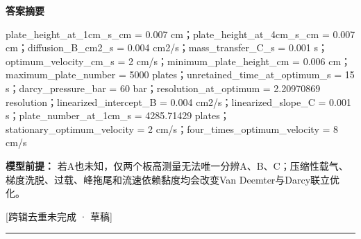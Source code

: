 \documentclass[UTF8,11pt,a4paper]{ctexart}
\begin{document}
\noindent\textbf{答案摘要}\par
plate\_height\_at\_1cm\_s\_cm = 0.007 cm；plate\_height\_at\_4cm\_s\_cm = 0.007 cm；diffusion\_B\_cm2\_s = 0.004 cm2/s；mass\_transfer\_C\_s = 0.001 s；optimum\_velocity\_cm\_s = 2 cm/s；minimum\_plate\_height\_cm = 0.006 cm；maximum\_plate\_number = 5000 plates；unretained\_time\_at\_optimum\_s = 15 s；darcy\_pressure\_bar = 60 bar；resolution\_at\_optimum = 2.20970869 resolution；linearized\_intercept\_B = 0.004 cm2/s；linearized\_slope\_C = 0.001 s；plate\_number\_at\_1cm\_s = 4285.71429 plates；stationary\_optimum\_velocity = 2 cm/s；four\_times\_optimum\_velocity = 8 cm/s\par
\noindent\textbf{模型前提：}
若A也未知，仅两个板高测量无法唯一分辨A、B、C；压缩性载气、梯度洗脱、过载、峰拖尾和流速依赖黏度均会改变Van Deemter与Darcy联立优化。\par
\noindent\textcolor{red!65!black}{[跨辑去重未完成 · 草稿]} \par
\medskip\hrule\medskip
{}
\end{document}
